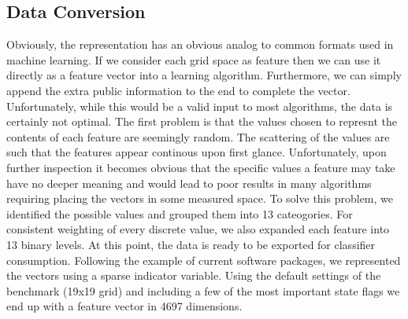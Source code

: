 \documentclass[]{article}   %
\begin{document}
\subsection{Data Conversion}
Obviously, the representation has an obvious analog to common formats used in machine learning.  If we consider each grid space as feature then we can use it directly as a feature vector into a learning algorithm.  Furthermore, we can simply append the extra public information to the end to complete the vector.  Unfortunately, while this would be a valid input to most algorithms, the data is certainly not optimal.
\newline\newline
The first problem is that the values chosen to represnt the contents of each feature are seemingly random.  The scattering of the values are such that the features appear continous upon first glance.  Unfortunately, upon further inspection it becomes obvious that the specific values a feature may take have no deeper meaning and would lead to poor results in many algorithms requiring placing the vectors in some measured space.  To solve this problem, we identified the possible values and grouped them into 13 cateogories.  For consistent weighting of every discrete value, we also expanded each feature into 13 binary levels.  At this point, the data is ready to be exported for classifier consumption.  Following the example of current software packages, we represented the vectors using a sparse indicator variable.  Using the default settings of the benchmark (19x19 grid) and including a few of the most important state flags we end up with a feature vector in 4697 dimensions.
\end{document}
